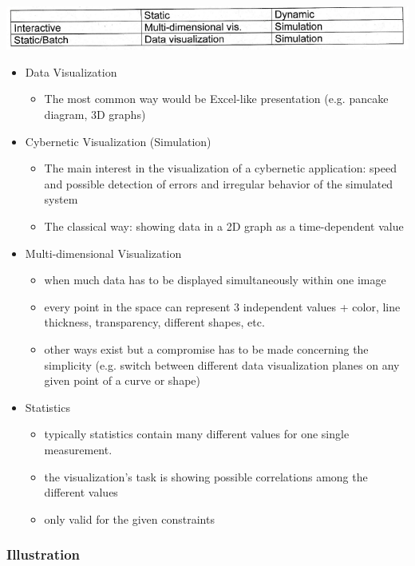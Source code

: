 \documentclass[12pt]{article}
\begin{document}
\includegraphics[scale=0.7]{3_8}

\begin{itemize}
	\item Data Visualization
		\begin{itemize}
			\item The most common way would be Excel-like presentation (e.g. pancake diagram, 3D graphs)
		\end{itemize}
	\item Cybernetic Visualization (Simulation)
		\begin{itemize}
			\item The main interest in the visualization of a cybernetic application: speed and possible detection of errors and irregular behavior of the simulated system
			\item The classical way: showing data in a 2D graph as a time-dependent value
		\end{itemize}
	\item Multi-dimensional Visualization
		\begin{itemize}
			\item when much data has to be displayed simultaneously within one image
			\item every point in the space can represent 3 independent values + color, line thickness, transparency, different shapes, etc.
			\item other ways exist but a compromise has to be made concerning the simplicity (e.g. switch between different data visualization planes on any given point of a curve or shape)
		\end{itemize}
	\item Statistics
		\begin{itemize}
			\item typically statistics contain many different values for one single measurement.
			\item the visualization's task is showing possible correlations among the different values
			\item only valid for the given constraints
		\end{itemize}
\end{itemize}

\subsubsection*{Illustration}
\end{document}
